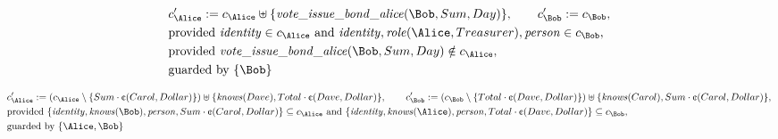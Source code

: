 \begin{align*}
&
c'_
{
\Alice
}
 := 
c_
{
\Alice
}
 \uplus 
\{
\mathit{\detokenize{
vote_issue_bond_alice
}}
(
\Bob
,
Sum
,
Day
)
\}
, \qquad 
c'_
{
\Bob
}
 := 
c_
{
\Bob
}
,\\
&
\text{provided } 
\mathit{\detokenize{
identity
}}
 \in c_
{
\Alice
}
 \text{ and } 
\mathit{\detokenize{
identity
}}
,
\mathit{\detokenize{
role
}}
(
\Alice
,
Treasurer
)
,
\mathit{\detokenize{
person
}}
 \in c_
{
\Bob
}
,\\
&
\text{provided } 
\mathit{\detokenize{
vote_issue_bond_alice
}}
(
\Bob
,
Sum
,
Day
)
 \notin c_
{
\Alice
}
,\\
&
\text{guarded by } \{
\Bob
\}
\end{align*}

\begin{align*}
&
c'_
{
\Alice
}
 := 
(c_
{
\Alice
}
 \setminus 
\{
Sum
\cdot
\text{\textcent}
(
Carol
,
Dollar
)
\}
) \uplus 
\{
\mathit{\detokenize{
knows
}}
(
Dave
)
,
Total
\cdot
\text{\textcent}
(
Dave
,
Dollar
)
\}
, \qquad 
c'_
{
\Bob
}
 := 
(c_
{
\Bob
}
 \setminus 
\{
Total
\cdot
\text{\textcent}
(
Dave
,
Dollar
)
\}
) \uplus 
\{
\mathit{\detokenize{
knows
}}
(
Carol
)
,
Sum
\cdot
\text{\textcent}
(
Carol
,
Dollar
)
\}
,\\
&
\text{provided } 
\{
\mathit{\detokenize{
identity
}}
,
\mathit{\detokenize{
knows
}}
(
\Bob
)
,
\mathit{\detokenize{
person
}}
,
Sum
\cdot
\text{\textcent}
(
Carol
,
Dollar
)
\}
 \subseteq c_
{
\Alice
}
 \text{ and } 
\{
\mathit{\detokenize{
identity
}}
,
\mathit{\detokenize{
knows
}}
(
\Alice
)
,
\mathit{\detokenize{
person
}}
,
Total
\cdot
\text{\textcent}
(
Dave
,
Dollar
)
\}
 \subseteq c_
{
\Bob
}
,\\
&
\text{guarded by } \{
\Alice
,
\Bob
\}
\end{align*}

